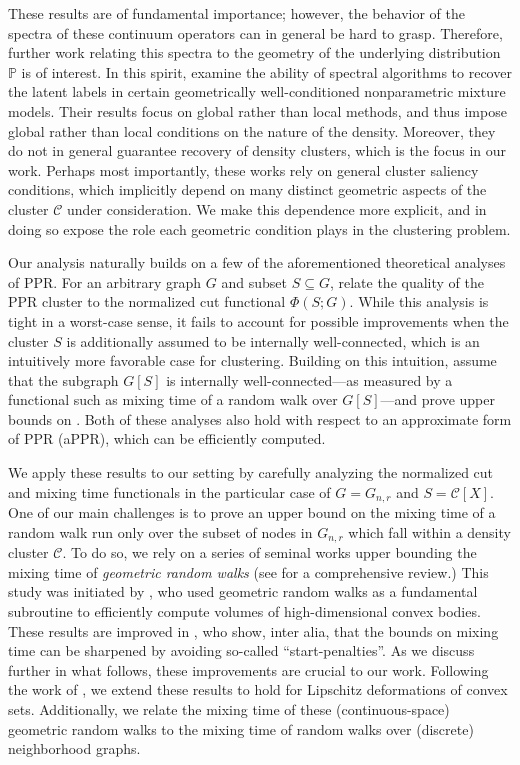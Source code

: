 \documentclass[11pt,twoside]{article}
\newcommand{\vol}{\mathrm{vol}}
\newcommand{\1}{\mathbbm{1}}
\newcommand{\Pbb}{\mathbb{P}}
\newcommand{\Cset}{\mathcal{C}}
\newcommand{\Cest}{\widehat{C}}
\begin{document}
These results are of fundamental importance; however, the behavior of the
spectra of these continuum operators can in general be hard to grasp. Therefore,
further work relating this spectra to the geometry of the underlying
distribution $\Pbb$ is of interest. In this spirit,
\citet{shi2009,schiebinger2015,garciatrillos19} examine the ability of spectral
algorithms to recover the latent labels in certain geometrically
well-conditioned nonparametric mixture models. Their results focus on global
rather than local methods, and thus impose global rather than local conditions
on the nature of the density. Moreover, they do not in general guarantee
recovery of density clusters, which is the focus in our work. Perhaps most
importantly, these works rely on general cluster saliency conditions, which
implicitly depend on many distinct geometric aspects of the cluster $\Cset$
under consideration. We make this dependence more explicit, and in doing so
expose the role each geometric condition plays in the clustering problem.

Our analysis naturally builds on a few of the aforementioned theoretical
analyses of PPR. For an arbitrary graph $G$ and subset $S \subseteq G$,
\citet{andersen2006} relate the quality of the PPR cluster \smash{$\Cest$} to
the normalized cut functional $\Phi(S;G)$. While this analysis is tight in a
worst-case sense, it fails to account for possible improvements when the cluster
$S$ is additionally assumed to be internally well-connected, which is an
intuitively more favorable case for clustering. Building on this intuition,  
\citet{zhu2013} assume that the subgraph $G[S]$ is internally
well-connected---as measured by a functional such as mixing time of a random
walk over $G[S]$---and prove upper bounds on \smash{$\vol(\Cest \vartriangle
  S;G)$}. Both of these analyses also hold with respect to an approximate form 
of PPR  (aPPR), which can be efficiently computed. 

We apply these results to our setting by carefully analyzing the normalized cut
and mixing time functionals in the particular case of $G = G_{n,r}$ and $S =
\Cset[X]$. One of our main challenges is to prove an upper bound on the mixing 
time of a random walk run only over the subset of nodes in $G_{n,r}$ which fall
within a density cluster $\Cset$. To do so, we rely on a series of seminal works
upper bounding the mixing time of \emph{geometric random walks} (see 
\citet{vempala2005} for a comprehensive review.)  This study was initiated by
\citet{dyer1991}, who used geometric random walks as a fundamental subroutine to
efficiently compute volumes of high-dimensional convex bodies. These results are
improved in \citet{lovasz1990,kannan97,kannan06}, who show, inter alia, that the
bounds on mixing time can be sharpened by avoiding so-called
``start-penalties''. As we discuss further in what follows, these improvements
are crucial to our work. Following the work of
\citet{abbasi-yadkori2016,abbasi-yadkori2016a}, we extend these results to hold
for Lipschitz deformations of convex sets. Additionally, we relate the mixing
time of these (continuous-space) geometric random walks to the mixing time of
random walks over (discrete) neighborhood graphs.
\end{document}
